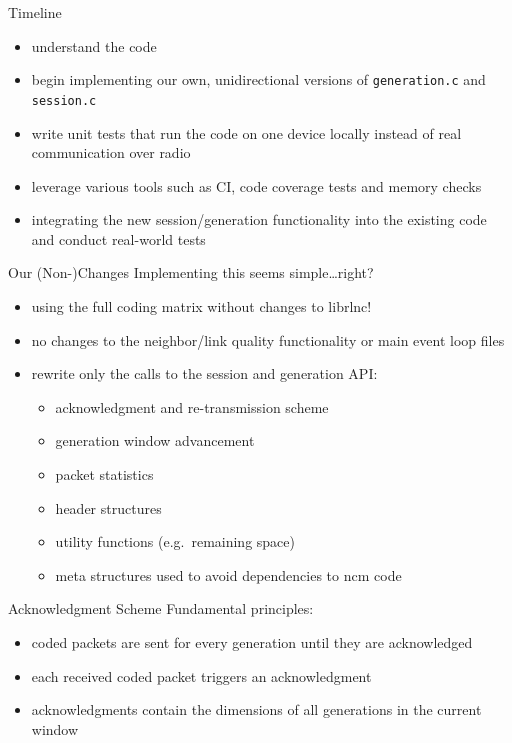 \documentclass[11pt]{beamer}
\begin{document}
	\begin{frame}{Timeline}
		\begin{itemize}
			\item understand the code
			\item begin implementing our own, unidirectional versions of \texttt{generation.c} and \texttt{session.c}
			\item write unit tests that run the code on one device locally instead of real communication over radio
			\item leverage various tools such as CI, code coverage tests and memory checks
			\item integrating the new session/generation functionality into the existing code and conduct real-world tests
		\end{itemize}
	\end{frame}

	\begin{frame}{Our (Non-)Changes}
		Implementing this seems simple\ldots right?
		\begin{itemize}
			\item using the full coding matrix without changes to librlnc!
			\item no changes to the neighbor/link quality functionality or main event loop files
			\item rewrite only the calls to the session and generation API:
			\begin{itemize}
				\item acknowledgment and re-transmission scheme
				\item generation window advancement
				\item packet statistics
				\item header structures
				\item utility functions (e.g.\ remaining space)
				\item meta structures used to avoid dependencies to ncm code
			\end{itemize}
		\end{itemize}
	\end{frame}

	\begin{frame}{Acknowledgment Scheme}
		Fundamental principles:
		\begin{itemize}
			\item coded packets are sent for every generation until they are acknowledged
			\item each received coded packet triggers an acknowledgment
			\item acknowledgments contain the dimensions of all generations in the current window
		\end{itemize}
	\end{frame}
\end{document}
